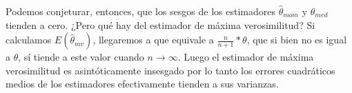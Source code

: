Podemos conjeturar, entonces, que los sesgos de los estimadores $\hat{\theta}_{mom}$ y $\hat{\theta}_{med}$ tienden a cero. ¿Pero qué hay del estimador de máxima verosimilitud? Si calculamos $E(\hat{\theta}_{mv})$, llegaremos a que equivale a $\frac{n}{n+1} * \theta$, que si bien no es igual a $\theta$, sí tiende a este valor cuando $n \rightarrow \infty$. Luego el estimador de máxima verosimilitud es asintóticamente insesgado por lo tanto los errores cuadráticos medios de los estimadores efectivamente tienden a sus varianzas.
